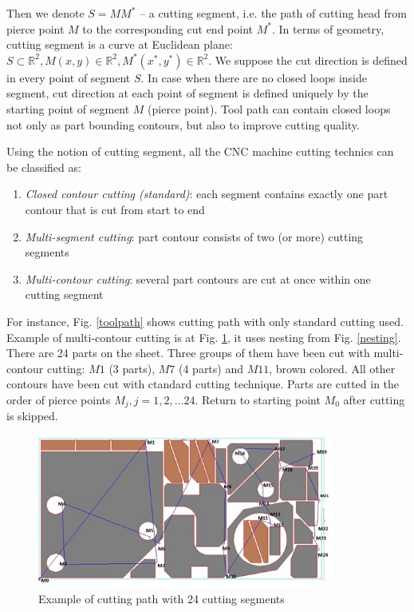 \documentclass{../download/tPRS2e}
\begin{document}
Then we denote $S=MM^*$ -- a cutting segment,
i.e. the path of cutting head
from pierce point $M$
to the corresponding cut end point $M^*$.
In terms of geometry,
cutting segment is a curve at Euclidean plane:
$S \subset \mathbb R^2,
M(x,y) \in \mathbb R^2,
M^*(x^*,y^*) \in \mathbb R^2$.
We suppose
the cut direction is defined
in every point of segment $S$.
In case when there are no
closed loops inside segment,
cut direction at each point of segment
is defined uniquely by the starting
point of segment $M$
(pierce point).
Tool path can contain closed loops
not only as part bounding contours,
but also to improve cutting quality.

Using the notion of cutting segment,
all the CNC machine cutting technics
can be classified as:
\begin{enumerate}
    \item{\textit{Closed contour cutting (standard)}}:
    each segment contains exactly one part contour
    that is cut from start to end
    \item{\textit{Multi-segment cutting}}:
    part contour consists of two (or more) cutting segments
    \item{\textit{Multi-contour cutting}}:
    several part contours are cut at once within one cutting segment
\end{enumerate}

For instance, Fig. \ref{toolpath}
shows cutting path with only
standard cutting used.
Example of multi-contour cutting is at
Fig. \ref{cutting},
it uses nesting from Fig. \ref{nesting}.
There are 24 parts on the sheet.
Three groups of them have been cut with multi-contour cutting:
$M1$ (3 parts),
$M7$ (4 parts) and
$M11$,
brown colored.
All other contours have been cut
with ctandard cutting technique.
Parts are cutted in the order of
pierce points $M_j, j=1, 2, \dots 24$.
Return to starting point $M_0$
after cutting is skipped.

\begin{figure}
    \begin{center}
    \includegraphics[width=0.87\textwidth]{cutting.png}
    \caption{Example of cutting path with 24 cutting segments} \label{cutting}
    \end{center}
\end{figure}
\end{document}
